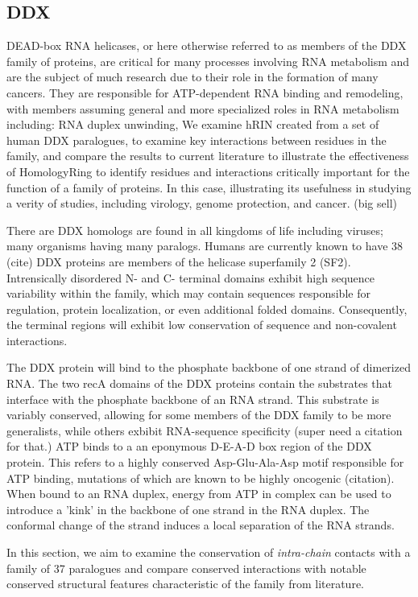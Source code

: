 \subsection{DDX}
DEAD-box RNA helicases, or here otherwise referred to as members of the DDX family of proteins, are critical for many processes involving RNA metabolism and are the subject of much research due to their role in the formation of many cancers. They are responsible for ATP-dependent RNA binding and remodeling, with members assuming general and more specialized roles in RNA metabolism including: RNA duplex unwinding, 
We examine hRIN created from a set of human DDX paralogues, to examine key interactions between residues in the family, and compare the results to current literature to illustrate the effectiveness of HomologyRing to identify residues and interactions critically important for the function of a family of proteins. In this case, illustrating its usefulness in studying a verity of studies, including virology, genome protection, and cancer. (big sell)

There are DDX homologs are found in all kingdoms of life including viruses; many organisms having many paralogs. Humans are currently known to have 38 (cite)
DDX proteins are members of the helicase superfamily 2 (SF2). 
Intrensically disordered N- and C- terminal domains exhibit high sequence variability within the family, which may contain sequences responsible for regulation, protein localization, or even additional folded domains. Consequently, the terminal regions will exhibit low conservation of sequence and non-covalent interactions.

The DDX protein will bind to the phosphate backbone of one strand of dimerized RNA. The two recA domains of the DDX proteins contain the substrates that interface with the phosphate backbone of an RNA strand. This substrate is variably conserved, allowing for some members of the DDX family to be more generalists, while others exbibit RNA-sequence specificity (super need a citation for that.) 
ATP binds to a an eponymous D-E-A-D box region of the DDX protein. This refers to a highly conserved Asp-Glu-Ala-Asp motif responsible for ATP binding, mutations of which are known to be highly oncogenic (citation). When bound to an RNA duplex, energy from ATP in complex can be used to introduce a 'kink' in the backbone of one strand in the RNA duplex. The conformal change of the strand induces a local separation of the RNA strands.

In this section, we aim to examine the conservation of \emph{intra-chain} contacts with a family of 37 paralogues and compare conserved interactions with notable conserved structural features characteristic of the family from literature. 


